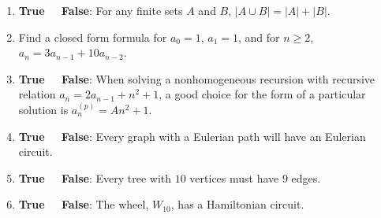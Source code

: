 \begin{enumerate}
\medskip

\item {\bf True \ \  False}: For any finite sets $A$ and $B$, $|A\cup B| = |A| + |B|$.

\medskip

\item Find a closed form formula for $a_0 = 1$, $a_1 = 1$, and for $n\geq2$, $a_n = 3a_{n-1} + 10a_{n-2}$.

\medskip

\item {\bf True \ \  False}: When solving a nonhomogeneous recursion with recursive relation
$a_n = 2a_{n-1} + n^2 + 1$, a good choice for the form of a particular solution is $a_n^{(p)} =  An^2 + 1$.

\medskip
 
 \item {\bf True \ \  False}: Every graph with a Eulerian path will have an Eulerian circuit.
 
 \medskip

\item {\bf True \ \  False}: Every tree with $10$ vertices must have $9$ edges. 

\medskip

\item {\bf True \ \  False}: The wheel, $W_{10}$, has a Hamiltonian circuit.

\end{enumerate}

\pagebreak

